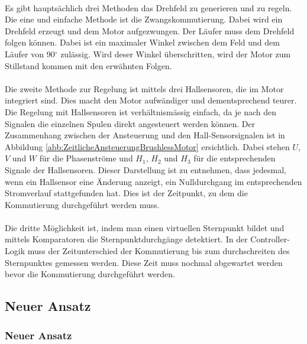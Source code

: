       \fi
       \\
        Es gibt hauptsächlich drei Methoden das Drehfeld zu generieren und zu 
        regeln. Die eine und einfache Methode ist die Zwangskommutierung. 
        Dabei wird ein Drehfeld erzeugt und dem Motor aufgezwungen. Der Läufer 
        muss dem Drehfeld folgen können. Dabei ist ein maximaler Winkel 
        zwischen dem Feld und dem Läufer von 90$^\circ$ zulässig. Wird deser 
        Winkel überschritten, wird der Motor zum Stillstand kommen mit den 
        erwähnten Folgen.\\
        \\
        Die zweite Methode zur Regelung ist mittels drei Hallsensoren, die im 
        Motor integriert sind. Dies macht den Motor aufwändiger und 
        dementsprechend teurer. Die Regelung mit Hallsensoren ist 
        verhältnismässig einfach, da je nach den Signalen die einzelnen Spulen 
        direkt angesteuert werden können. Der Zusammenhang zwischen der 
        Ansteuerung und den Hall-Sensorsignalen ist in Abbildung 
        \ref{abb:ZeitlicheAnsteuerungBrushlessMotor} ersichtlich. Dabei stehen 
        $U$, $V$ und $W$ für die Phasenströme und $H_1$, $H_2$ und $H_3$ für die 
        entsprechenden Signale der Hallsensoren. Dieser Darstellung ist zu 
        entnehmen, dass jedesmal, wenn ein Hallsensor eine Änderung anzeigt, 
        ein Nulldurchgang im entsprechenden Stromverlauf stattgefunden hat. 
        Dies ist der Zeitpunkt, zu dem die Kommutierung durchgeführt werden 
        muss.\\
        \\
        Die dritte Möglichkeit ist, indem man einen virtuellen Sternpunkt 
        bildet und mittels Komparatoren die Sternpunktdurchgänge detektiert. 
        In der Controller-Logik muss der Zeitunterschied der Kommutierung 
        bis zum durchschreiten des Sternpunktes gemessen werden. Diese Zeit 
        muss nochmal abgewartet werden bevor die Kommutierung durchgeführt 
        werden.
    \ifSTANDALONE
    \subsection{Neuer Ansatz}
    \fi
    \ifEMBED
    \subsubsection{Neuer Ansatz}
    \fi

